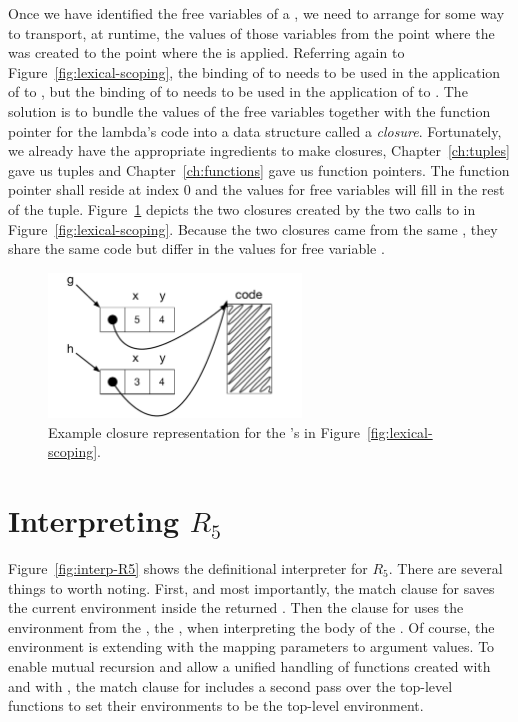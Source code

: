 \documentclass[11pt]{book}
\begin{document}
Once we have identified the free variables of a , we need
to arrange for some way to transport, at runtime, the values of those
variables from the point where the  was created to the
point where the  is applied. Referring again to
Figure~\ref{fig:lexical-scoping}, the binding of  to 
needs to be used in the application of  to , but the
binding of  to  needs to be used in the application of
 to . The solution is to bundle the values of the
free variables together with the function pointer for the lambda's
code into a data structure called a \emph{closure}. Fortunately, we
already have the appropriate ingredients to make closures,
Chapter~\ref{ch:tuples} gave us tuples and Chapter~\ref{ch:functions}
gave us function pointers. The function pointer shall reside at index
$0$ and the values for free variables will fill in the rest of the
tuple. Figure~\ref{fig:closures} depicts the two closures created by
the two calls to  in Figure~\ref{fig:lexical-scoping}.
Because the two closures came from the same , they share
the same code but differ in the values for free variable .

\begin{figure}[tbp]
\centering \includegraphics[width=0.6\textwidth]{figs/closures}
\caption{Example closure representation for the 's
  in Figure~\ref{fig:lexical-scoping}.}
\label{fig:closures}
\end{figure}


\section{Interpreting $R_5$}

Figure~\ref{fig:interp-R5} shows the definitional interpreter for
$R_5$. There are several things to worth noting. First, and most
importantly, the match clause for  saves the current
environment inside the returned . Then the clause for
 uses the environment from the , the
, when interpreting the body of the .  Of
course, the  environment is extending with the mapping
parameters to argument values. To enable mutual recursion and allow a
unified handling of functions created with  and with
, the match clause for  includes a second
pass over the top-level functions to set their environments to be the
top-level environment.
\end{document}
